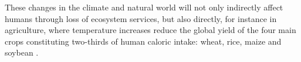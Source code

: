 
These changes in the climate and natural world will not only indirectly affect humans through loss of ecosystem services, but also directly, for instance in agriculture, where temperature increases reduce the global yield of the four main crops constituting two-thirds of human caloric intake: wheat, rice, maize and soybean \cite{Zhao2017}.


